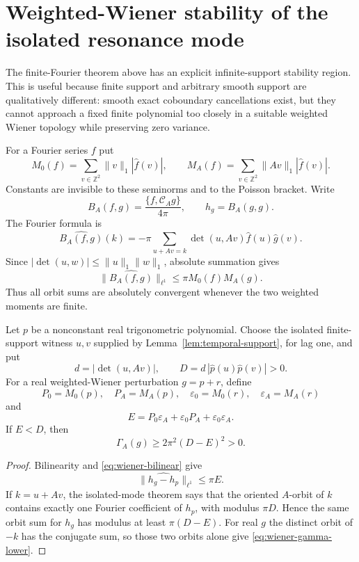 \section{Weighted-Wiener stability of the isolated resonance mode}
\label{sec:wiener-resonance-stability}
The finite-Fourier theorem above has an explicit infinite-support stability
region.  This is useful because finite support and arbitrary smooth support
are qualitatively different: smooth exact coboundary cancellations exist, but
they cannot approach a fixed finite polynomial too closely in a suitable
weighted Wiener topology while preserving zero variance.

For a Fourier series $f$ put
\[
 M_0(f)=\sum_{v\in\mathbb Z^2}\|v\|_1|\widehat f(v)|,
 \qquad
 M_A(f)=\sum_{v\in\mathbb Z^2}\|Av\|_1|\widehat f(v)|.
 \tag{W.1}\label{eq:wiener-moments}
\]
Constants are invisible to these seminorms and to the Poisson bracket.  Write
\[
 B_A(f,g)=\frac{\{f,\mathcal C_A g\}}{4\pi},
 \qquad h_g=B_A(g,g).
\]
The Fourier formula is
\[
 \widehat{B_A(f,g)}(k)
 =-\pi\!\sum_{u+Av=k}\det(u,Av)\widehat f(u)\widehat g(v).
 \tag{W.2}\label{eq:wiener-bracket}
\]
Since $|\det(u,w)|\leq\|u\|_1\|w\|_1$, absolute summation gives
\begin{equation}\label{eq:wiener-bilinear}
 \|\widehat{B_A(f,g)}\|_{\ell^1}
 \leq \pi M_0(f)M_A(g).
\end{equation}
Thus all orbit sums are absolutely convergent whenever the two weighted
moments are finite.

\begin{theorem}
\label{thm:wiener-resonance-stability}
Let $p$ be a nonconstant real trigonometric polynomial.  Choose the isolated
finite-support witness $u,v$ supplied by Lemma~\ref{lem:temporal-support},
for lag one, and put
\[
 d=|\det(u,Av)|,\qquad
 D=d\,|\widehat p(u)\widehat p(v)|>0.
\]
For a real weighted-Wiener perturbation $g=p+r$, define
\[
 P_0=M_0(p),\quad P_A=M_A(p),\quad
 \varepsilon_0=M_0(r),\quad \varepsilon_A=M_A(r)
\]
and
\[
 E=P_0\varepsilon_A+\varepsilon_0P_A
       +\varepsilon_0\varepsilon_A.
\]
If $E<D$, then
\begin{equation}\label{eq:wiener-gamma-lower}
 \Gamma_A(g)\geq2\pi^2(D-E)^2>0.
\end{equation}
\end{theorem}

\begin{proof}
Bilinearity and \eqref{eq:wiener-bilinear} give
\[
 \|\widehat{h_g-h_p}\|_{\ell^1}
 \leq\pi E.
\]
If $k=u+Av$, the isolated-mode theorem says that the oriented $A$-orbit of
$k$ contains exactly one Fourier coefficient of $h_p$, with modulus $\pi D$.
Hence the same orbit sum for $h_g$ has modulus at least $\pi(D-E)$.
For real $g$ the distinct orbit of $-k$ has the conjugate sum, so those two
orbits alone give \eqref{eq:wiener-gamma-lower}.
\end{proof}

